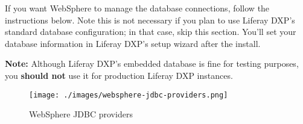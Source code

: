 If you want WebSphere to manage the database connections, follow the
instructions below. Note this is not necessary if you plan to use
Liferay DXP's standard database configuration; in that case, skip this
section. You'll set your database information in Liferay DXP's setup
wizard after the install.

\noindent\hrulefill

\textbf{Note:} Although Liferay DXP's embedded database is fine for
testing purposes, you \textbf{should not} use it for production Liferay
DXP instances.

\noindent\hrulefill

\begin{figure}
\centering
\texttt{[image: ./images/websphere-jdbc-providers.png]}
\caption{WebSphere JDBC providers}
\end{figure}

